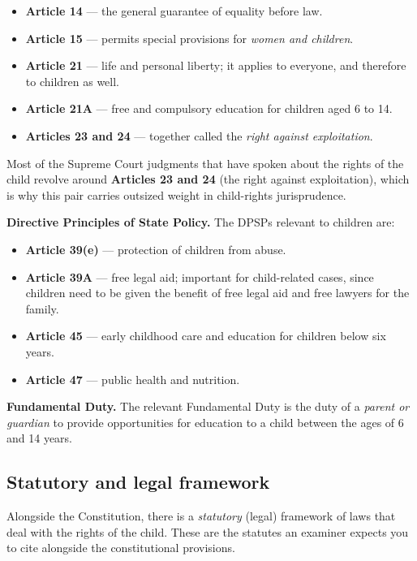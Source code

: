 \begin{itemize}
  \item \textbf{Article 14} — the general guarantee of equality before law.
  \item \textbf{Article 15} — permits special provisions for \emph{women and children}.
  \item \textbf{Article 21} — life and personal liberty; it applies to everyone,
        and therefore to children as well.
  \item \textbf{Article 21A} — free and compulsory education for children aged 6 to 14.
  \item \textbf{Articles 23 and 24} — together called the \emph{right against
        exploitation}.
\end{itemize}

\begin{CriticalPoint}
Most of the Supreme Court judgments that have spoken about the rights of the child
revolve around \textbf{Articles 23 and 24} (the right against exploitation), which is
why this pair carries outsized weight in child-rights jurisprudence.
\end{CriticalPoint}

\textbf{Directive Principles of State Policy.} The DPSPs relevant to children are:

\begin{itemize}
  \item \textbf{Article 39(e)} — protection of children from abuse.
  \item \textbf{Article 39A} — free legal aid; important for child-related cases, since
        children need to be given the benefit of free legal aid and free lawyers for the
        family.
  \item \textbf{Article 45} — early childhood care and education for children below six
        years.
  \item \textbf{Article 47} — public health and nutrition.
\end{itemize}

\textbf{Fundamental Duty.} The relevant Fundamental Duty is the duty of a \emph{parent
or guardian} to provide opportunities for education to a child between the ages of 6 and
14 years.

\subsection{Statutory and legal framework}

Alongside the Constitution, there is a \emph{statutory} (legal) framework of laws that
deal with the rights of the child. These are the statutes an examiner expects you to
cite alongside the constitutional provisions.

